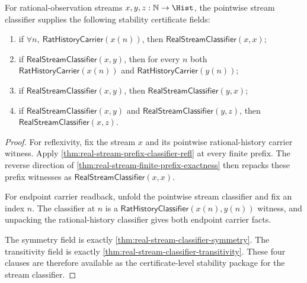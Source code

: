 \begin{theorem}
\label{thm:real-stream-classifier-certificate-fields}
For rational-observation streams $x,y,z:\mathbb{N}\to\Hist$, the pointwise
stream classifier supplies the following stability certificate fields:
\begin{enumerate}
  \item if $\forall n,\ \mathsf{RatHistoryCarrier}(x(n))$, then
  $\mathsf{RealStreamClassifier}(x,x)$;
  \item if $\mathsf{RealStreamClassifier}(x,y)$, then for every $n$ both
  $\mathsf{RatHistoryCarrier}(x(n))$ and $\mathsf{RatHistoryCarrier}(y(n))$;
  \item if $\mathsf{RealStreamClassifier}(x,y)$, then
  $\mathsf{RealStreamClassifier}(y,x)$;
  \item if $\mathsf{RealStreamClassifier}(x,y)$ and
  $\mathsf{RealStreamClassifier}(y,z)$, then
  $\mathsf{RealStreamClassifier}(x,z)$.
\end{enumerate}
\end{theorem}
\begin{proof}
For reflexivity, fix the stream $x$ and its pointwise rational-history carrier
witness. Apply \autoref{thm:real-stream-prefix-classifier-refl} at every finite
prefix. The reverse direction of
\autoref{thm:real-stream-finite-prefix-exactness} then repacks these prefix
witnesses as $\mathsf{RealStreamClassifier}(x,x)$.

For endpoint carrier readback, unfold the pointwise stream classifier and fix an
index $n$. The classifier at $n$ is a $\mathsf{RatHistoryClassifier}(x(n),y(n))$
witness, and unpacking the rational-history classifier gives both endpoint
carrier facts.

The symmetry field is exactly
\autoref{thm:real-stream-classifier-symmetry}. The transitivity field is exactly
\autoref{thm:real-stream-classifier-transitivity}. These four clauses are
therefore available as the certificate-level stability package for the stream
classifier.
\end{proof}

